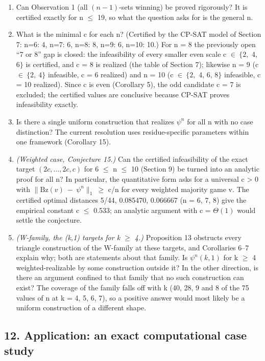 \documentclass[
]{article}
\providecommand{\tightlist}{%
  \setlength{\itemsep}{0pt}\setlength{\parskip}{0pt}}
\begin{document}
\begin{enumerate}
\def\labelenumi{\arabic{enumi}.}
\tightlist
\item
  Can Observation 1 (all \((n-1)\)-sets winning) be proved rigorously?
  It is certified exactly for n \(\le\) 19, so what the question asks
  for is the general n.
\item
  What is the minimal c for each n? (Certified by the CP-SAT model of
  Section 7: n=6: 4, n=7: 6, n=8: 8, n=9: 6, n=10: 10.) For n = 8 the
  previously open ``7 or 8'' gap is closed: the infeasibility of every
  smaller even scale c \(\in\ \{2,\) 4, \(6\}\) is certified, and c = 8
  is realized (the table of Section 7); likewise n = 9 (c
  \(\in\ \{2,\ 4\}\) infeasible, c = 6 realized) and n = 10 (c
  \(\in\ \{2,\) 4, 6, \(8\}\) infeasible, c = 10 realized). Since c is
  even (Corollary 5), the odd candidate c = 7 is excluded; the certified
  values are conclusive because CP-SAT proves infeasibility exactly.
\item
  Is there a single uniform construction that realizes \(\psi^n\) for
  all n with no case distinction? The current resolution uses
  residue-specific parameters within one framework (Corollary 15).
\item
  \emph{(Weighted case, Conjecture 15.)} Can the certified infeasibility
  of the exact target \((2c,\dots,2c,c)\) for 6 \(\le\) n \(\le\) 10
  (Section 9) be turned into an analytic proof for all n? In particular,
  the quantitative form asks for a universal c \textgreater{} 0 with
  \(\|\mathrm{Bz}(v)\ -\ \psi^n\|_1\ \ge\) c/n for every weighted
  majority game v. The certified optimal distances 5/44, 0.085470,
  0.066667 (n = 6, 7, 8) give the empirical constant c \(\le\) 0.533; an
  analytic argument with c = \(\Theta(1)\) would settle the conjecture.
\item
  \emph{(W-family, the (k,1) targets for k \(\ge\) 4.)} Proposition 13
  obstructs every triangle construction of the W-family at these
  targets, and Corollaries 6--7 explain why; both are statements about
  that family. Is \(\psi^n(k,1)\) for k \(\ge\) 4 weighted-realizable by
  some construction outside it? In the other direction, is there an
  argument confined to that family that no such construction can exist?
  The coverage of the family falls off with k (40, 28, 9 and 8 of the 75
  values of n at k = 4, 5, 6, 7), so a positive answer would most likely
  be a uniform construction of a different shape.
\end{enumerate}

\subsection{12. Application: an exact computational case
study}\label{application-an-exact-computational-case-study}
\end{document}
